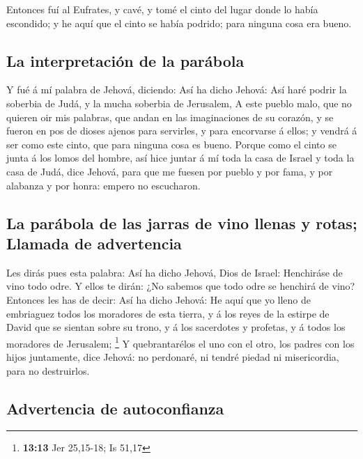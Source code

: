  Entonces fuí al Eufrates, y cavé, y tomé el cinto del lugar
donde lo había escondido; y he aquí que el cinto se había podrido; para
ninguna cosa era bueno.

\hypertarget{la-interpretaciuxf3n-de-la-paruxe1bola}{%
\subsection{La interpretación de la
parábola}\label{la-interpretaciuxf3n-de-la-paruxe1bola}}

 Y fué á mí palabra de Jehová, diciendo:  Así ha
dicho Jehová: Así haré podrir la soberbia de Judá, y la mucha soberbia
de Jerusalem,  A este pueblo malo, que no quieren oir mis
palabras, que andan en las imaginaciones de su corazón, y se fueron en
pos de dioses ajenos para servirles, y para encorvarse á ellos; y vendrá
á ser como este cinto, que para ninguna cosa es bueno. 
Porque como el cinto se junta á los lomos del hombre, así hice juntar á
mí toda la casa de Israel y toda la casa de Judá, dice Jehová, para que
me fuesen por pueblo y por fama, y por alabanza y por honra: empero no
escucharon.

\hypertarget{la-paruxe1bola-de-las-jarras-de-vino-llenas-y-rotas-llamada-de-advertencia}{%
\subsection{La parábola de las jarras de vino llenas y rotas; Llamada de
advertencia}\label{la-paruxe1bola-de-las-jarras-de-vino-llenas-y-rotas-llamada-de-advertencia}}

 Les dirás pues esta palabra: Así ha dicho Jehová, Dios de
Israel: Henchiráse de vino todo odre. Y ellos te dirán: ¿No sabemos que
todo odre se henchirá de vino?  Entonces les has de decir:
Así ha dicho Jehová: He aquí que yo lleno de embriaguez todos los
moradores de esta tierra, y á los reyes de la estirpe de David que se
sientan sobre su trono, y á los sacerdotes y profetas, y á todos los
moradores de Jerusalem; \footnote{\textbf{13:13} Jer 25,15-18; Is 51,17}
 Y quebrantarélos el uno con el otro, los padres con los
hijos juntamente, dice Jehová: no perdonaré, ni tendré piedad ni
misericordia, para no destruirlos.

\hypertarget{advertencia-de-autoconfianza}{%
\subsection{Advertencia de
autoconfianza}\label{advertencia-de-autoconfianza}}

